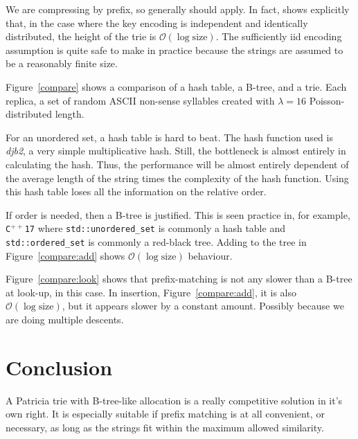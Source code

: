 \documentclass[14pt]{article}
\newcommand{\code}[1]{\colorbox{light-gray}{\texttt{#1}}}
\begin{document}
We are compressing by prefix, so generally \cite{shannon1948mathematical} should apply. In fact, \cite{tong2016smoothed} shows explicitly that, in the case where the key encoding is independent and identically distributed, the height of the trie is $\mathcal{O}(\log \text{size})$. The sufficiently iid encoding assumption is quite safe to make in practice because the strings are assumed to be a reasonably finite size.

Figure~\ref{compare} shows a comparison of a hash table, a B-tree, and a trie. Each replica, a set of random ASCII non-sense syllables created with $\lambda = 16$ Poisson-distributed length.

For an unordered set, a hash table is hard to beat. The hash function used is {\it djb2}, a very simple multiplicative hash. Still, the bottleneck is almost entirely in calculating the hash. Thus, the performance will be almost entirely dependent of the average length of the string times the complexity of the hash function. Using this hash table loses all the information on the relative order.

If order is needed, then a B-tree is justified. This is seen practice in, for example, \code{C$^{++}$17} where \code{std::unordered\_set} is commonly a hash table and \code{std::ordered\_set} is commonly a red-black tree. Adding to the tree in Figure~\ref{compare:add} shows $\mathcal{O}(\log \text{size})$ behaviour.

Figure~\ref{compare:look} shows that prefix-matching is not any slower than a B-tree at look-up, in this case. In insertion, Figure~\ref{compare:add}, it is also $\mathcal{O}(\log \text{size})$, but it appears slower by a constant amount. Possibly because we are doing multiple descents.

\section{Conclusion}

A Patricia trie with B-tree-like allocation is a really competitive solution in it's own right. It is especially suitable if prefix matching is at all convenient, or necessary, as long as the strings fit within the maximum allowed similarity.


\end{document}
